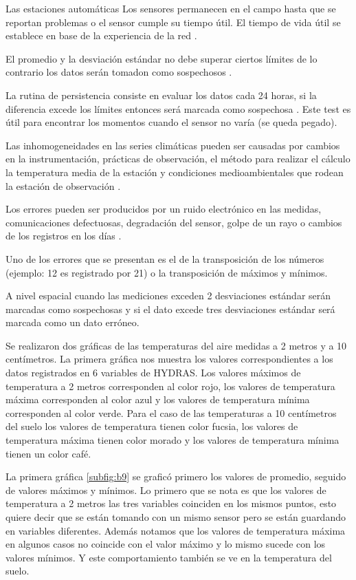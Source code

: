 \documentclass[11pt]{article}
\begin{document}
Las estaciones automáticas Los sensores permanecen en el campo hasta que se reportan problemas o el sensor cumple su tiempo útil. El tiempo de vida útil se establece en base de la experiencia de la red \citep{Shafer2000}.

El promedio y la desviación estándar no debe superar ciertos límites de lo contrario los datos serán tomadon como sospechosos \citep{Shafer2000}.

La rutina de persistencia consiste en evaluar los datos cada 24 horas, si la diferencia excede los límites entonces será marcada como sospechosa \citep{Shafer2000}. Este test es útil para encontrar los momentos cuando el sensor no varía (se queda pegado).

Las inhomogeneidades en las series climáticas pueden ser causadas por cambios en la instrumentación, prácticas de observación, el método para realizar el cálculo la temperatura media de la estación y condiciones medioambientales que rodean la estación de observación \citep{Menne2001}.

Los errores pueden ser producidos por un ruido electrónico en las medidas, comunicaciones defectuosas, degradación del sensor, golpe de un rayo o cambios de los registros en los días \citep{Menne2001}.

Uno de los errores que se presentan es el de la transposición de los números (ejemplo: 12 es registrado por 21) o la transposición de máximos y mínimos.

A nivel espacial cuando las mediciones exceden 2 desviaciones estándar serán marcadas como sospechosas y si el dato excede tres desviaciones estándar será marcada como un dato erróneo.

Se realizaron dos gráficas de las temperaturas del aire medidas a 2 metros y a 10 centímetros. La primera gráfica nos muestra los valores correspondientes a los datos registrados en 6 variables de HYDRAS. Los valores máximos de temperatura a 2 metros corresponden al color rojo, los valores de temperatura máxima corresponden al color azul y los valores de temperatura mínima corresponden al color verde. Para el caso de las temperaturas a 10 centímetros del suelo los valores de temperatura tienen color fucsia, los valores de temperatura máxima tienen color morado y los valores de temperatura mínima tienen un color café.

La primera gráfica \ref{subfig:b9} se graficó primero los valores de promedio, seguido de valores máximos y mínimos. Lo primero que se nota es que los valores de temperatura a 2 metros las tres variables coinciden en los mismos puntos, esto quiere decir que se están tomando con un mismo sensor pero se están guardando en variables diferentes. Además notamos que los valores de temperatura máxima en algunos casos no coincide con el valor máximo y lo mismo sucede con los valores mínimos. Y este comportamiento también se ve en la temperatura del suelo.
\end{document}
